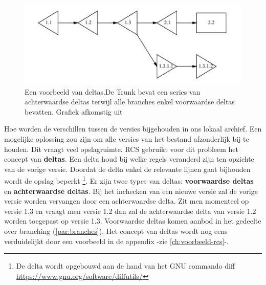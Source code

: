 \begin{figure}
\label{fig:deltas}
\begin{center}
  	\includegraphics[scale=0.6]{deltas.png}
\end{center}
\caption[Voorbeeld van deltas.]{Een voorbeeld van deltas.De Trunk bevat een series van achterwaardse deltas terwijl alle branches enkel voorwaardse deltas bevatten. Grafiek afkomstig uit \textcite{Tichy85rcs}}
\end{figure}

Hoe worden de verschillen tussen de versies bijgehouden in ons lokaal archief. Een mogelijke oplossing zou zijn om alle versies van het bestand afzonderlijk bij te houden. Dit vraagt veel opslagruimte. RCS gebruikt voor dit probleem het concept van \textbf{deltas}. Een delta houd bij welke regels veranderd zijn ten opzichte van de vorige versie. Doordat de delta enkel de relevante lijnen gaat bijhouden wordt de opslag beperkt \footnote{De delta wordt opgebouwd aan de hand van het GNU commando diff \url{https://www.gnu.org/software/diffutils/}}. Er zijn twee types van deltas: \textbf{voorwaardse deltas} en \textbf{achterwaardse deltas}. Bij het inchecken van een nieuwe versie zal de vorige versie worden vervangen door een achterwaardse delta. Zit men momenteel op versie 1.3 en  vraagt men versie 1.2 dan zal de achterwaardse delta van versie 1.2 worden toegepast op versie 1.3. Voorwaardse deltas komen aanbod in het gedeelte over branching (\ref{par:branches}). Het concept van deltas wordt nog eens verduidelijkt door een voorbeeld in de appendix -zie \ref{ch:voorbeeld-rcs}-.\\


